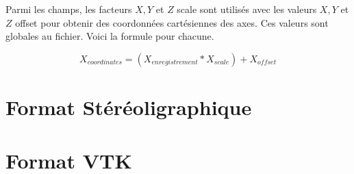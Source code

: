Parmi les champs, les facteurs $ X, Y $ et $ Z $ scale sont utilisés avec les valeurs $ X, Y$ et $Z$ offset pour obtenir des coordonnées cartésiennes des axes.
Ces valeurs sont globales au fichier. Voici la formule pour chacune.  

\begin{equation}
    X_{coordinates} = (X_{enregistrement} * X_{scale}) + X_{offset}
\end{equation}


\section{Format Stéréoligraphique}
\section{Format VTK}

